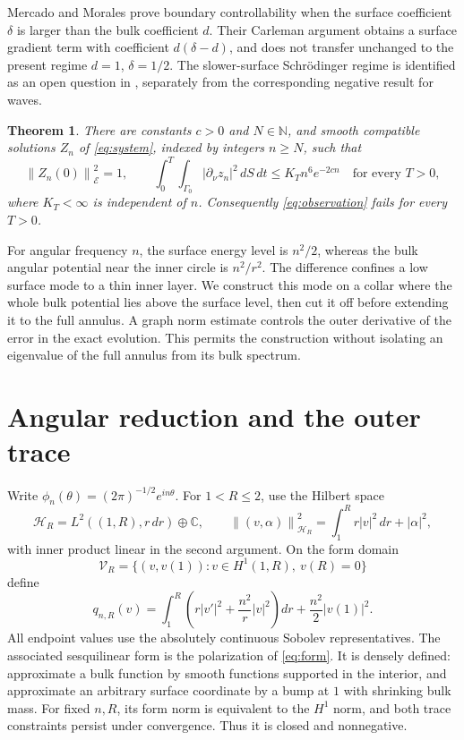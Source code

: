 \documentclass[11pt]{article}
\newtheorem{theorem}{Theorem}
\newcommand{\HH}{\mathcal H}
\newcommand{\EE}{\mathcal E}
\newcommand{\CC}{\mathbb C}
\newcommand{\norm}[1]{\left\|#1\right\|}
\begin{document}
Mercado and Morales \cite[author preprint, Theorem 1.9 and equation (3.20)]{MM} prove boundary
controllability when the surface coefficient \(\delta\) is larger than
the bulk coefficient \(d\). Their Carleman argument obtains a surface
gradient term with coefficient \(d(\delta-d)\), and does not transfer
unchanged to the present regime \(d=1\), \(\delta=1/2\).
The slower-surface Schr\"odinger regime is identified as an open question
in \cite[Section 5.1]{CMM}, separately from the corresponding negative
result for waves.

\begin{theorem}\label{thm:failure}
There are constants \(c>0\) and \(N\in\mathbb N\), and smooth compatible
solutions \(Z_n\) of \eqref{eq:system}, indexed by integers \(n\ge N\), such
that
\[
\norm{Z_n(0)}_{\EE}^{2}=1,
\qquad
\int_0^T\int_{\Gamma_0}|\partial_\nu z_n|^2\,dS\,dt
\le K_T n^6e^{-2cn}\quad\text{for every }T>0,
\]
where \(K_T<\infty\) is independent of \(n\). Consequently
\eqref{eq:observation} fails for every \(T>0\).
\end{theorem}

For angular frequency \(n\), the surface energy level is \(n^2/2\), whereas
the bulk angular potential near the inner circle is \(n^2/r^2\). The
difference confines a low surface mode to a thin inner layer. We construct
this mode on a collar where the whole bulk potential lies above the surface
level, then cut it off before extending it to the full annulus. A graph
norm estimate controls the outer derivative of the error in the exact
evolution. This permits the construction without isolating an eigenvalue
of the full annulus from its bulk spectrum.

\section{Angular reduction and the outer trace}

Write \(\phi_n(\theta)=(2\pi)^{-1/2}e^{in\theta}\). For \(1<R\le2\), use
the Hilbert space
\[
\HH_R=L^2((1,R),r\,dr)\oplus\CC,\qquad
\norm{(v,\alpha)}_{\HH_R}^{2}=\int_1^R r|v|^2\,dr+|\alpha|^2,
\]
with inner product linear in the second argument. On the form domain
\[
\mathcal V_R=\{(v,v(1)):v\in H^1(1,R),\ v(R)=0\}
\]
define
\begin{equation}\label{eq:form}
q_{n,R}(v)=
\int_1^R\left(r|v'|^2+\frac{n^2}{r}|v|^2\right)dr
+\frac{n^2}{2}|v(1)|^2.
\end{equation}
All endpoint values use the absolutely continuous Sobolev representatives.
The associated sesquilinear form is the polarization of
\eqref{eq:form}. It is densely defined: approximate a bulk function by
smooth functions supported in the interior, and approximate an arbitrary
surface coordinate by a bump at \(1\) with shrinking bulk mass.
For fixed \(n,R\), its form norm is equivalent to the \(H^1\) norm, and
both trace constraints persist under convergence. Thus it is closed and
nonnegative.
\end{document}
